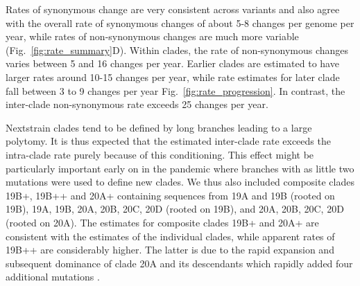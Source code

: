 \documentclass[aps,rmp, twocolumn]{revtex4}
\begin{document}
Rates of synonymous change are very consistent across variants and also agree with the overall rate of synonymous changes of about 5-8 changes per genome per year, while rates of non-synonymous changes are much more variable (Fig.~\ref{fig:rate_summary}D).
Within clades, the rate of non-synonymous changes varies between 5 and 16 changes per year.
Earlier clades are estimated to have larger rates around 10-15 changes per year, while rate estimates for later clade fall  between 3 to 9 changes per year Fig.~\ref{fig:rate_progression}.
In contrast, the inter-clade non-synonymous rate exceeds 25 changes per year.

Nextstrain clades tend to be defined by long branches leading to a large polytomy.
It is thus expected that the estimated inter-clade rate exceeds the intra-clade rate purely because of this conditioning.
This effect might be particularly important early on in the pandemic where branches with as little two mutations were used to define new clades.
We thus also included composite clades 19B+, 19B++ and 20A+ containing sequences from 19A and 19B (rooted on 19B), 19A, 19B, 20A, 20B, 20C, 20D (rooted on 19B), and 20A, 20B, 20C, 20D (rooted on 20A).
The estimates for composite clades 19B+ and 20A+ are consistent with the estimates of the individual clades, while apparent rates of 19B++ are considerably higher.
The latter is due to the rapid expansion and subsequent dominance of clade 20A and its descendants which rapidly added four additional mutations \citep{korber_tracking_2020}.
\end{document}
